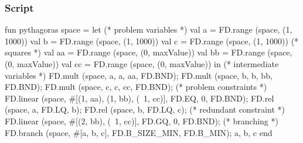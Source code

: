 \documentclass[a4paper]{scrartcl}
\begin{document}
\subsubsection{Script}
\begin{myverbatim}
fun pythagoras space =
   let
      (* problem variables *)
      val a = FD.range (space, (1, 1000))
      val b = FD.range (space, (1, 1000))
      val c = FD.range (space, (1, 1000))
      (* squares *)
      val aa = FD.range (space, (0, maxValue))
      val bb = FD.range (space, (0, maxValue))
      val cc = FD.range (space, (0, maxValue))
   in
      (* intermediate variables *)
      FD.mult (space, a, a, aa, FD.BND);
      FD.mult (space, b, b, bb, FD.BND);
      FD.mult (space, c, c, cc, FD.BND);
      (* problem constraints *)
      FD.linear (space, #[(1, aa), (1, bb), (~1, cc)], FD.EQ, 0, FD.BND);
      FD.rel (space, a, FD.LQ, b);
      FD.rel (space, b, FD.LQ, c);
      (* redundant constraint *)
      FD.linear (space, #[(2, bb), (~1, cc)], FD.GQ, 0, FD.BND);
      (* branching *)
      FD.branch (space, #[a, b, c], FD.B_SIZE_MIN, FD.B_MIN);
      {a, b, c}
   end
\end{myverbatim}
\end{document}
